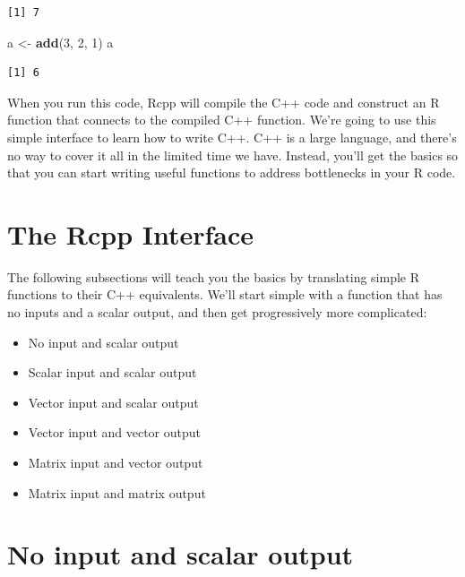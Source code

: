\documentclass[
]{krantz}
\makeatletter
\newenvironment{Shaded}{\begin{snugshade}}{\end{snugshade}}
\newcommand{\DecValTok}[1]{\textcolor[rgb]{0.06,0.06,0.06}{#1}}
\newcommand{\KeywordTok}[1]{\textcolor[rgb]{0.27,0.27,0.27}{\textbf{#1}}}
\newcommand{\NormalTok}[1]{#1}
\newcommand{\StringTok}[1]{\textcolor[rgb]{0.5,0.5,0.5}{#1}}
\providecommand{\tightlist}{%
  \setlength{\itemsep}{0pt}\setlength{\parskip}{0pt}}
\newenvironment{kframe}{%
\medskip{}
\setlength{\fboxsep}{.8em}
 \def\at@end@of@kframe{}%
 \ifinner\ifhmode%
  \def\at@end@of@kframe{\end{minipage}}%
  \begin{minipage}{\columnwidth}%
 \fi\fi%
 \def\FrameCommand##1{\hskip\@totalleftmargin \hskip-\fboxsep
 \colorbox{shadecolor}{##1}\hskip-\fboxsep
     \hskip-\linewidth \hskip-\@totalleftmargin \hskip\columnwidth}%
 \MakeFramed {\advance\hsize-\width
   \@totalleftmargin\z@ \linewidth\hsize
   \@setminipage}}%
 {\par\unskip\endMakeFramed%
 \at@end@of@kframe}
\renewenvironment{Shaded}{\begin{kframe}}{\end{kframe}}
\makeatother
\begin{document}
\begin{verbatim}
[1] 7
\end{verbatim}

\begin{Shaded}
\begin{Highlighting}[]
\NormalTok{a \textless{}{-}}\StringTok{ }\KeywordTok{add}\NormalTok{(}\DecValTok{3}\NormalTok{, }\DecValTok{2}\NormalTok{, }\DecValTok{1}\NormalTok{)}
\NormalTok{a}
\end{Highlighting}
\end{Shaded}

\begin{verbatim}
[1] 6
\end{verbatim}

When you run this code, Rcpp will compile the C++ code and construct an R function that connects to the compiled C++ function. We're going to use this simple interface to learn how to write C++. C++ is a large language, and there's no way to cover it all in the limited time we have. Instead, you'll get the basics so that you can start writing useful functions to address bottlenecks in your R code.

\hypertarget{the-rcpp-interface}{%
\section{The Rcpp Interface}\label{the-rcpp-interface}}

The following subsections will teach you the basics by translating simple R functions to their C++ equivalents. We'll start simple with a function that has no inputs and a scalar output, and then get progressively more complicated:

\begin{itemize}
\tightlist
\item
  No input and scalar output
\item
  Scalar input and scalar output
\item
  Vector input and scalar output
\item
  Vector input and vector output
\item
  Matrix input and vector output
\item
  Matrix input and matrix output
\end{itemize}

\hypertarget{no-input-and-scalar-output}{%
\section{No input and scalar output}\label{no-input-and-scalar-output}}
\end{document}

